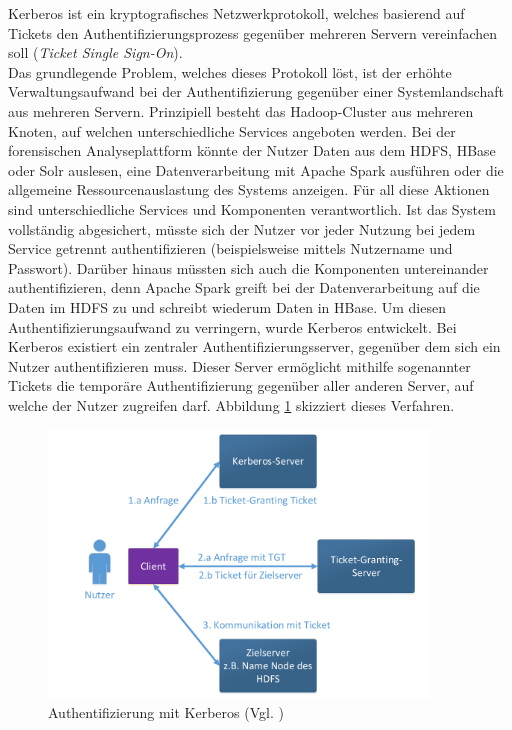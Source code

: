 \noindent
Kerberos ist ein kryptografisches Netzwerkprotokoll, welches basierend auf Tickets den Authentifizierungsprozess gegenüber mehreren Servern vereinfachen soll (\textit{Ticket Single Sign-On}).\cite[S. 425-429]{crypto}\\
Das grundlegende Problem, welches dieses Protokoll löst, ist der erhöhte Verwaltungsaufwand bei der Authentifizierung gegenüber einer Systemlandschaft aus mehreren Servern. Prinzipiell besteht das Hadoop-Cluster aus mehreren Knoten, auf welchen unterschiedliche Services angeboten werden. Bei der forensischen Analyseplattform könnte der Nutzer Daten aus dem HDFS, HBase oder Solr auslesen, eine Datenverarbeitung mit Apache Spark ausführen oder die allgemeine Ressourcenauslastung des Systems anzeigen. Für all diese Aktionen sind unterschiedliche Services und Komponenten verantwortlich. Ist das System vollständig abgesichert, müsste sich der Nutzer vor jeder Nutzung bei jedem Service getrennt authentifizieren (beispielsweise mittels Nutzername und Passwort). Darüber hinaus müssten sich auch die Komponenten untereinander authentifizieren, denn Apache Spark greift bei der Datenverarbeitung auf die Daten im HDFS zu und schreibt wiederum Daten in HBase. Um diesen Authentifizierungsaufwand zu verringern, wurde Kerberos entwickelt. 
Bei Kerberos existiert ein zentraler Authentifizierungsserver, gegenüber dem sich ein Nutzer authentifizieren muss. Dieser Server ermöglicht mithilfe sogenannter Tickets die temporäre Authentifizierung gegenüber aller anderen Server, auf welche der Nutzer zugreifen darf.\cite[S. 425-429]{crypto} Abbildung \ref{fig:kerberos} skizziert dieses Verfahren. 
\begin{figure}[ht]
  \centering
  \includegraphics[width=0.9\textwidth]{./resource/kerberos_authentification.pdf}
  \caption{Authentifizierung mit Kerberos (Vgl. \cite[S.426]{crypto})}
  \label{fig:kerberos}
\end{figure}


